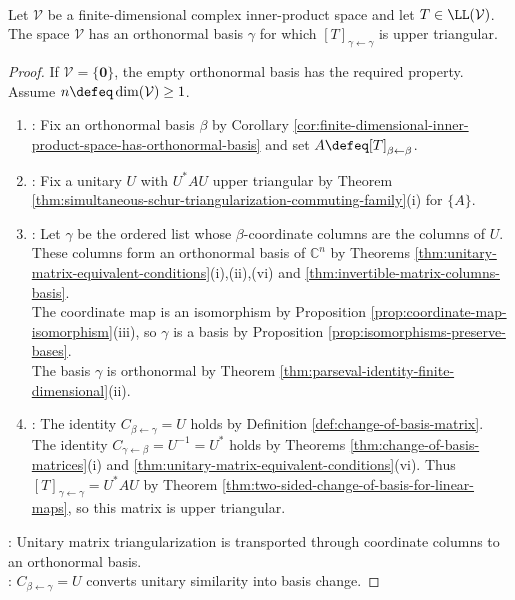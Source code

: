 \begin{theorem} \label{thm:schur-triangularization} \\
Let $\mathcal{V}$ be a finite-dimensional complex inner-product space and let $T\in\LL(\mathcal{V})$.\\
The space $\mathcal{V}$ has an orthonormal basis $\gamma$ for which $[T]_{\gamma\leftarrow\gamma}$ is upper triangular.
\begin{proof}
If $\mathcal{V}=\{\mathbf{0}\}$, the empty orthonormal basis has the required property. Assume $n\defeq\dim(\mathcal{V})\geq1$.
\begin{enumerate}[label=(\roman*)]
\setlength{\itemsep}{0pt}
\item {}: Fix an orthonormal basis $\beta$ by Corollary \ref{cor:finite-dimensional-inner-product-space-has-orthonormal-basis} and set $A\defeq[T]_{\beta\leftarrow\beta}$.
\item {}: Fix a unitary $U$ with $U^*AU$ upper triangular by Theorem \ref{thm:simultaneous-schur-triangularization-commuting-family}(i) for $\{A\}$.
\item {}: Let $\gamma$ be the ordered list whose $\beta$-coordinate columns are the columns of $U$.\\
These columns form an orthonormal basis of $\mathbb{C}^n$ by Theorems \ref{thm:unitary-matrix-equivalent-conditions}(i),(ii),(vi) and \ref{thm:invertible-matrix-columns-basis}.\\
The coordinate map is an isomorphism by Proposition \ref{prop:coordinate-map-isomorphism}(iii), so $\gamma$ is a basis by Proposition \ref{prop:isomorphisms-preserve-bases}.\\
The basis $\gamma$ is orthonormal by Theorem \ref{thm:parseval-identity-finite-dimensional}(ii).
\item {}: The identity $C_{\beta\leftarrow\gamma}=U$ holds by Definition \ref{def:change-of-basis-matrix}.\\
The identity $C_{\gamma\leftarrow\beta}=U^{-1}=U^*$ holds by Theorems \ref{thm:change-of-basis-matrices}(i) and \ref{thm:unitary-matrix-equivalent-conditions}(vi). Thus $[T]_{\gamma\leftarrow\gamma}=U^*AU$ by Theorem \ref{thm:two-sided-change-of-basis-for-linear-maps}, so this matrix is upper triangular.
\end{enumerate}
: Unitary matrix triangularization is transported through coordinate columns to an orthonormal basis.\\
: $C_{\beta\leftarrow\gamma}=U$ converts unitary similarity into basis change.
\end{proof}
\end{theorem}

